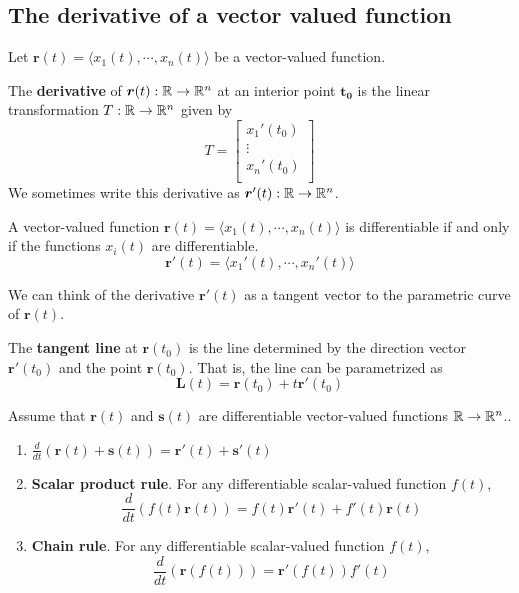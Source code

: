 \subsection{The derivative of a vector valued function}

\begin{theorem}
    Let $\bm{r}(t) = \langle x_1(t), \cdots, x_n(t) \rangle$ be a vector-valued function.  
    
    The \textbf{derivative} of $\bm{r}(t) : \mathbb{R} \to \mathbb{R}^n$ at an interior point $\bm{t_0}$ is the linear transformation $T: \mathbb{R} \to \mathbb{R}^n$ given by 
    $$T = 
\begin{bmatrix}
x_1'(t_0) \\
\vdots \\
x_n'(t_0) \\
\end{bmatrix}$$
We sometimes write this derivative as $\bm{r}'(t) : \mathbb{R} \to \mathbb{R}^n$.
\end{theorem}


\begin{theorem}
    A vector-valued function $\bm{r}(t)= \langle x_1(t), \cdots, x_n(t) \rangle$ is differentiable if and only if the functions $x_i(t)$ are differentiable.
     $$\bm{r}'(t) = \langle x_1'(t), \cdots, x_n'(t) \rangle$$
\end{theorem}

    We can think of the derivative $\bm{r}'(t)$ as a tangent vector to the parametric curve of $\bm{r}(t)$.


\begin{definition}
    The \textbf{tangent line} at $\bm{r}(t_0)$ is the line determined by the direction vector $\bm{r}'(t_0)$ and the point $\bm{r}(t_0)$.  That is, the line can be parametrized as 
    $$\bm{L}(t) = \bm{r}(t_0) + t\bm{r}'(t_0)$$
    \end{definition}


\begin{theorem}
       Assume that $\bm{r}(t)$ and $\bm{s}(t)$ are differentiable vector-valued functions $\mathbb{R} \to \mathbb{R}^n$..
       
      \begin{enumerate}
        \item $\frac{d}{dt}(\bm{r}(t) + \bm{s}(t)) = \bm{r}'(t) + \bm{s}'(t)$ 
        \item \textbf{Scalar product rule}. For any differentiable scalar-valued function $f(t)$, 
        $$\frac{d}{dt}(f(t)\bm{r}(t)) = f(t)\bm{r}'(t) + f'(t)\bm{r}(t)$$   
        \vspace{-1em}
        \item \textbf{Chain rule}. For any differentiable scalar-valued function $f(t)$, $$\frac{d}{dt}(\bm{r}(f(t))) =  \bm{r}'(f(t))f'(t)$$  
    \end{enumerate}
    \end{theorem}

